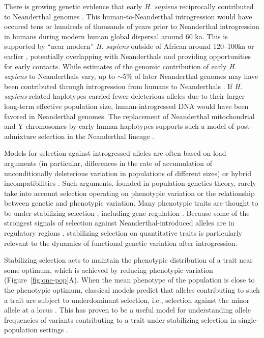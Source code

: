 \documentclass{article}
\begin{document}
There is growing genetic evidence that early \emph{H. sapiens} reciprocally
contributed to Neanderthal genomes
\citep{kuhlwilm2016ancient,hubisz2020mapping,harris2023diverse}. This
human-to-Neanderthal introgression would have occured tens or hundreds of
thousands of years prior to Neanderthal introgression in humans during modern
human global dispersal around 60 ka. This is supported by ``near modern''
\emph{H. sapiens} outside of African around 120--100ka or earlier
\citep{schwarcz1988esr,grun2005u,beyer2021climatic}, potentially overlapping
with Neanderthals and providing opportunities for early contacts. While
estimates of the genomic contribution of early \emph{H. sapiens} to
Neanderthals vary, up to $\sim5\%$ of later Neanderthal genomes may have been
contributed through introgression from humans to Neanderthals
\citep{harris2023diverse}. If \emph{H. sapiens}-related haplotypes carried
fewer deleterious alleles due to their larger long-term effective population
size, human-introgressed DNA would have been favored in Neanderthal genomes.
The replacement of Neanderthal mitochondrial and Y chromosomes by early human
haplotypes supports such a model of post-admixture selection in the Neanderthal
lineage \citep{posth2017deeply,petr2020evolutionary}.

Models for selection against introgressed alleles are often based on load
arguments (in particular, differences in the rate of accumulation of
unconditionally deleterious variation in populations of different sizes) or
hybrid incompatibilities \citep{muller1942isolating}. Such arguments, founded
in population genetics theory, rarely take into account selection operating on
phenotypic variation or the relationship between genetic and phenotypic
variation. Many phenotypic traits are thought to be under stabilizing selection
\citep{sanjak2018evidence,sella2019thinking}, including gene regulation
\citep{gilad2006natural,hodgins2015gene,price2022detecting}. Because some of
the strongest signals of selection against Neanderthal-introduced alleles are
in regulatory regions \citep{sankararaman2014genomic}, stabilizing selection on
quantitative traits is particularly relevant to the dynamics of functional
genetic variation after introgression.

Stabilizing selection acts to maintain the phenotypic distribution of a trait
near some optimum, which is achieved by reducing phenotypic variation
(Figure~\ref{fig:one-pop}A). When the mean phenotype of the population is close
to the phenotypic optimum, classical models predict that alleles contributing
to such a trait are subject to underdominant selection, i.e., selection against
the minor allele at a locus \citep{robertson1956effect}. This has proven to be
a useful model for understanding allele frequencies of variants contributing to
a trait under stabilizing selection in single-population settings
\citep[e.g.,][]{keightley1988quantitative, simons2018population,
hayward2022polygenic}.
\end{document}
